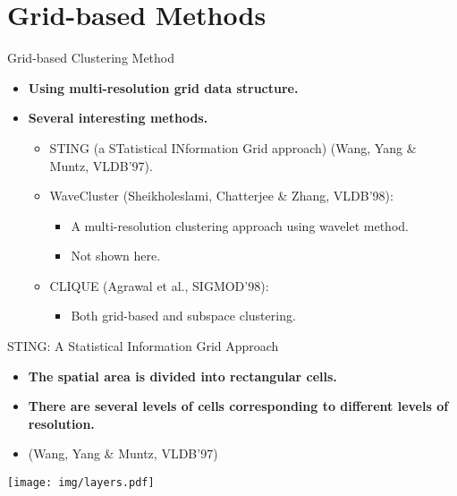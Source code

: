 \section{Grid-based Methods}

\begin{frame}{Grid-based Clustering Method}
	\begin{itemize}
		\item \textbf{Using multi-resolution grid data structure.}
		\item \textbf{Several interesting methods.}
		      \begin{itemize}
			      \item STING (a STatistical INformation Grid approach) (Wang, Yang
			            \& Muntz, VLDB'97).
			      \item WaveCluster (Sheikholeslami, Chatterjee \& Zhang, VLDB'98):
			            \begin{itemize}
				            \item A multi-resolution clustering approach using wavelet
				                  method.
				            \item Not shown here.
			            \end{itemize}
			      \item CLIQUE (Agrawal et al., SIGMOD'98):
			            \begin{itemize}
				            \item Both grid-based and subspace clustering.
			            \end{itemize}
		      \end{itemize}
	\end{itemize}
\end{frame}

\begin{frame}{STING: A Statistical Information Grid Approach}
	\begin{itemize}
		\item \textbf{The spatial area is divided into rectangular cells.}
		\item \textbf{There are several levels of cells corresponding to
			      different levels of resolution.}
		\item (Wang, Yang \& Muntz, VLDB'97)
	\end{itemize}
	\vspace{0.5cm}
	\centering
	\texttt{[image: img/layers.pdf]}
\end{frame}

